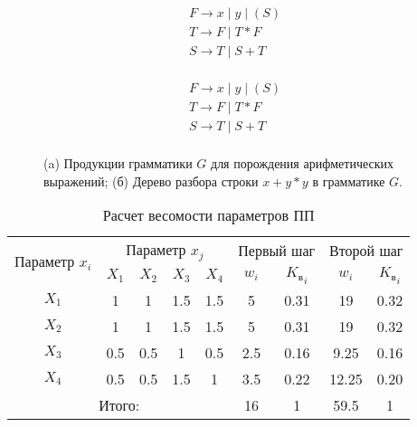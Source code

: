 \documentclass[a4paper,14pt,russian]{extreport}
\begin{document}
    \begin{figure}[ht]
        \centering
            \begin{subfigure}[b]{0.3\textwidth}
            \centering
                $$\begin{array}{l}
                F \to x \;|\; y \;|\; (S) \\
                T \to F \;|\; T \ast F \\
                S \to T \;|\; S + T \\    
                \end{array}$$
                \caption{}
            \end{subfigure} %
            \begin{subfigure}[b]{0.6\textwidth}
            \centering
                $$\begin{array}{l}
                F \to x \;|\; y \;|\; (S) \\
                T \to F \;|\; T \ast F \\
                S \to T \;|\; S + T \\    
                \end{array}$$
                \caption{}
            \end{subfigure}
         
            \caption{(a) Продукции грамматики $G$ для порождения арифметических выражений; 
                     (б) Дерево разбора строки $x+y\ast y$ в грамматике $G$.}
            
            \label{fig_parsetree}
        \end{figure}

        \begin{table}[ht]
            \caption{Расчет весомости параметров ПП}
            \label{tab_weight}
            \centering
                \begin{tabular}{|c|c|c|c|c|c|c|c|c|}
                \hline \multirow{2}{*}{Параметр $x_i$} & \multicolumn{4}{c|}{Параметр $x_j$} & 
                    \multicolumn{2}{c|}{Первый шаг} & \multicolumn{2}{c|}{Второй шаг} \\
                \cline{2-9} & $X_1$ & $X_2$ & $X_3$ & $X_4$ & $w_i$ & 
                    ${K_\text{в}}_i$ & $w_i$ & ${K_\text{в}}_i$ \\
                \hline $X_1$ & 1 & 1 & 1.5 & 1.5 & 5 & 0.31 & 19 & 0.32 \\
                \hline $X_2$ & 1 & 1 & 1.5 & 1.5 & 5 & 0.31 & 19 & 0.32 \\
                \hline $X_3$ & 0.5 & 0.5 & 1 & 0.5 & 2.5 & 0.16 & 9.25 & 0.16 \\
                \hline $X_4$ & 0.5 & 0.5 & 1.5 & 1 & 3.5 & 0.22 & 12.25 & 0.20 \\
                \hline \multicolumn{5}{|c|}{Итого:} & 16 & 1 & 59.5 & 1 \\
                \hline
                \end{tabular}
        \end{table}
\end{document}
